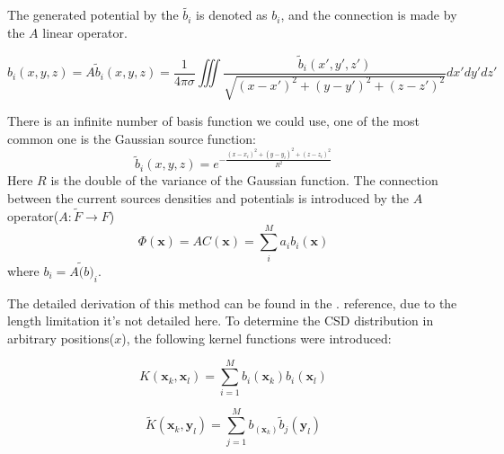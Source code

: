\documentclass[12pt,a4paper]{article}
\begin{document}

The generated potential by the $\tilde{b_i}$ is denoted as  $b_i$, and the connection is made by the $A$ linear operator.

\begin{equation}
\label{eq:bfun}
b_i (x,y,z)= A \tilde{b}_i (x,y,z)= \frac{1}{4 \pi \sigma} \iiint 
\frac{ \tilde{b}_i (x',y',z')}{\sqrt{(x-x')^2+(y-y')^2+(z-z')^2}} dx' dy' dz'
\end{equation}

There is an infinite number of basis function we could use, one of the most common one is the Gaussian source function:
\begin{equation}
\label{eq:basisfun}
\tilde{b}_i (x,y,z) = e^{- \frac{(x-x_i)^2+(y-y_i)^2+(z-z_i)^2}{R^2}}
\end{equation}
Here $R$ is the double of the variance of the Gaussian function. The connection between the current sources densities and potentials is introduced by the $A$ operator($A: \tilde{F}\rightarrow F$)
\begin{equation}
\Phi(\textbf{x})= A C(\textbf{x}) =  \sum_{i}^M a_i b_i (\textbf{x})
\end{equation}
 where $b_i = A \tilde(b)_i$.
 
 
 
 
 
The detailed derivation of this method can be found in the \cite{DanielW}. reference, due to the length limitation it's not detailed here.
To determine the CSD distribution in arbitrary positions($x$), the following kernel functions were introduced:

\begin{equation}
K(\textbf{x}_k,\textbf{x}_l)= \sum_{i=1}^M b_i (\textbf{x}_k) b_i (\textbf{x}_l)
\end{equation} 
 
\begin{equation}
\tilde{K}(\textbf{x}_k,\textbf{y}_l)= \sum_{j=1}^M b_ (\textbf{x}_k) \tilde{b}_j (\textbf{y}_l) 
\end{equation} 
 
\end{document}
